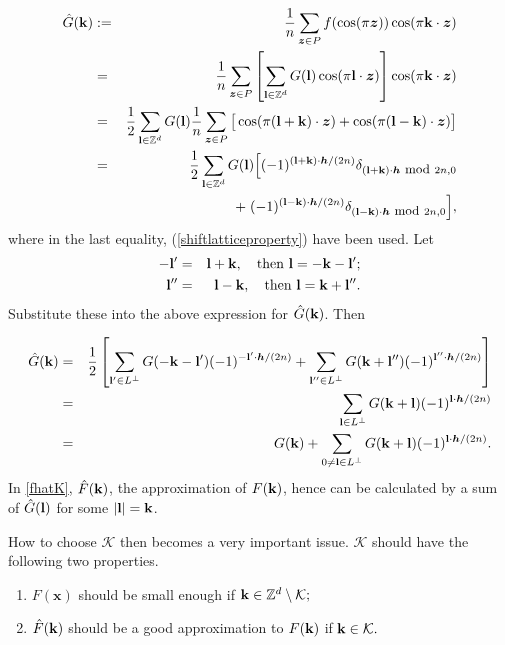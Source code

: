\documentclass[article]{siamltex}
\def\bx{\boldsymbol x}
\def\bz{{\boldsymbol z}}
\def\bk{{\bf k}}
\def\bh{{\boldsymbol h}}
\def\bl{{\bf l}}
\def\K {\mathcal {K}}
\newcommand{\Z}{{\mathbb Z}}
\newcommand{\dsum}{\displaystyle\sum}
\begin{document}
\begin{eqnarray}\label{hatG}
 \hat{G}(\bk) &:=& \frac{1}{n} \dsum_{\bz\in P}f(\cos(\pi \bz))
 \cos(\pi\bk \cdot \bz)\nonumber\\
 &=& \frac{1}{n} \dsum_{\bz\in P} \left[\dsum_{\bl\in {\Z}^d}
 {G(\bl)}
 \cos(\pi \bl \cdot \bz)\right]\cos(\pi\bk \cdot
 \bz)\nonumber\\
 &=& \frac{1}{2} \dsum_{\bl\in {\Z}^d}
 {G(\bl)} \frac{1}{n}
 \dsum_{\bz\in P} \big[\cos(\pi(\bl+\bk)\cdot \bz)
  + \cos(\pi(\bl-\bk)\cdot \bz)\big]\nonumber\\
  &=& \frac{1}{2} \dsum_{\bl\in {\Z}^d}
{G(\bl)}
  \Big[(-1)^{(\bl +\bk)\cdot \bh/(2n)}\delta_{(\bl+\bk)
  \cdot \bh\ \hbox{\small mod}\ 2n, 0}
  \nonumber\\
  &&\qquad \qquad \qquad
  +\; (-1)^{(\bl - \bk)\cdot \bh/(2n)}\delta_{(\bl-\bk)
  \cdot \bh\ \hbox{\small mod}\ 2n, 0}
   \Big],
\end{eqnarray}
where in the last equality, (\ref{shiftlatticeproperty}) have been
used.
 Let
\begin{eqnarray*}
 -\bl'&=&\bl +\bk,\quad\hbox{then}\
 \bl=-\bk-\bl';\\
 \bl''&=&\bl -\bk,\quad\hbox{then}\
 \bl=\bk+\bl''.
\end{eqnarray*}
Substitute these into the above expression for $\hat{G}(\bk)$.
Then

\begin{eqnarray}\label{Aliasing}
 \hat{G}(\bk) &=& \frac{1}{2} \left[
 \dsum_{\bl'\in L^{\bot}}
  {G(-\bk-\bl')}
 (-1)^{-\bl'\cdot \bh/(2n)} +
 \dsum_{\bl''\in L^{\bot}}
  {G(\bk+\bl'')}
 (-1)^{\bl''\cdot \bh/(2n)}\right]\nonumber\\
 &=& \dsum_{\bl\in L^{\bot}} {G(\bk + \bl)}
 (-1)^{\bl\cdot \bh/(2n)}\nonumber\\
 &=& {G(\bk)}
 + \dsum_{0\neq\bl\in L^{\bot}} {G(\bk + \bl)}
 (-1)^{\bl\cdot \bh/(2n)}.
\end{eqnarray}
In \eqref{fhatK}, $\hat{F}(\bk)$, the approximation of  $F(\bk)$, hence can be calculated by a sum of $\hat{G}(\bl)$ for some $|\bl|=\bk$.

How to choose ${\K}$ then becomes a very
important issue. ${\K}$ should have the following two properties.
\begin{enumerate}\label{prpt}
\item $F(\bx)$ should be small enough if
$\bk\in\Z^d\setminus{{\K}};$ \item $\hat{F}(\bk)$ should be a
good approximation to  ${F}(\bk)$ if
$\bk\in {\K}.$
\end{enumerate}
\end{document}
